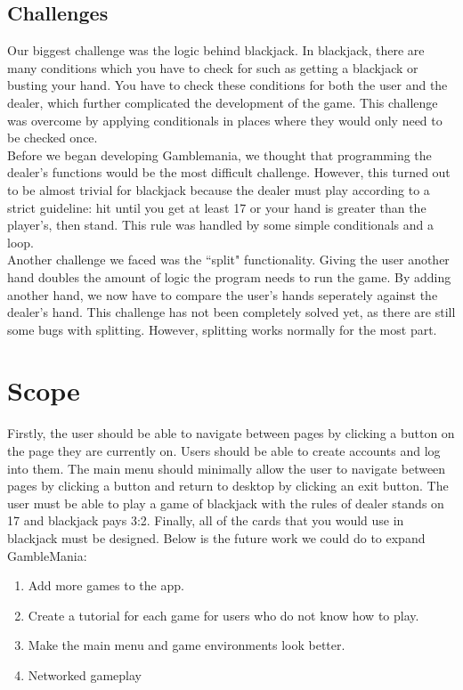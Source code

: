 \documentclass[10pt,conference,onecolumn,compsoc]{IEEEtran}
\begin{document}
\subsection{Challenges}
Our biggest challenge was the logic behind blackjack. In blackjack, there are many conditions which you have to check for such as getting a blackjack or busting your hand. You have to check these conditions for both the user and the dealer, which further complicated the development of the game. This challenge was overcome by applying conditionals in places where they would only need to be checked once.\\
\newline
Before we began developing Gamblemania, we thought that programming the dealer's functions would be the most difficult challenge. However, this turned out to be almost trivial for blackjack because the dealer must play according to a strict guideline: hit until you get at least 17 or your hand is greater than the player's, then stand. This rule was handled by some simple conditionals and a loop.\\
\newline
Another challenge we faced was the ``split" functionality. Giving the user another hand doubles the amount of logic the program needs to run the game. By adding another hand, we now have to compare the user's hands seperately against the dealer's hand. This challenge has not been completely solved yet, as there are still some bugs with splitting. However, splitting works normally for the most part.

\section{Scope}
Firstly, the user should be able to navigate between pages by clicking a button on the page they are currently on. Users should be able to create accounts and log into them. The main menu should minimally allow the user to navigate between pages by clicking a button and return to desktop by clicking an exit button. The user must be able to play a game of blackjack with the rules of dealer stands on 17 and blackjack pays 3:2. Finally, all of the cards that you would use in blackjack must be designed.
\newline
Below is the future work we could do to expand GambleMania:\\

\begin{enumerate}
\item Add more games to the app.
\item Create a tutorial for each game for users who do not know how to play.
\item Make the main menu and game environments look better.
\item Networked gameplay
\end{enumerate}
\end{document}
